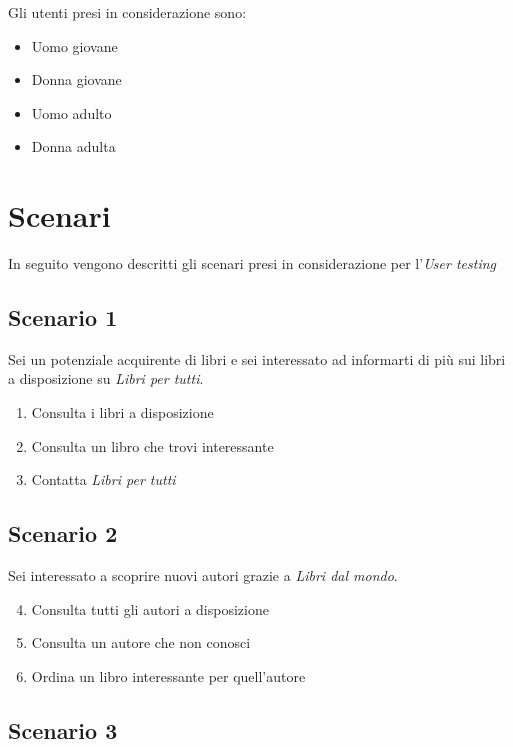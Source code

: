 \documentclass[12pt,a4paper,oneside]{report}
\begin{document}
Gli utenti presi in considerazione sono:

\begin{itemize}
	\item Uomo giovane
	\item Donna giovane
	\item Uomo adulto
	\item Donna adulta
\end{itemize}

\newpage

\section {Scenari}

In seguito vengono descritti gli scenari presi in considerazione per l'\textit{User testing}

\subsection{Scenario 1}

Sei un potenziale acquirente di libri e sei interessato ad informarti di più sui libri a disposizione su \textit{Libri per tutti}.\\

\begin{enumerate}
	\item Consulta i libri a disposizione
	\item Consulta un libro che trovi interessante
	\item Contatta \textit{Libri per tutti}
\end{enumerate}

\subsection{Scenario 2}

Sei interessato a scoprire nuovi autori grazie a \textit{Libri dal mondo}.\\

\begin{enumerate}
	\setcounter{enumi}{3}
	\item Consulta tutti gli autori a disposizione
	\item Consulta un autore che non conosci
	\item Ordina un libro interessante per quell'autore
\end{enumerate}

\subsection{Scenario 3}
\end{document}
